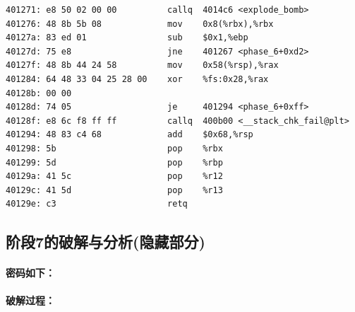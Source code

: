 \begin{lstlisting}
401271:	e8 50 02 00 00       	callq  4014c6 <explode_bomb>
401276:	48 8b 5b 08          	mov    0x8(%rbx),%rbx
40127a:	83 ed 01             	sub    $0x1,%ebp
40127d:	75 e8                	jne    401267 <phase_6+0xd2>
40127f:	48 8b 44 24 58       	mov    0x58(%rsp),%rax
401284:	64 48 33 04 25 28 00 	xor    %fs:0x28,%rax
40128b:	00 00 
40128d:	74 05                	je     401294 <phase_6+0xff>
40128f:	e8 6c f8 ff ff       	callq  400b00 <__stack_chk_fail@plt>
401294:	48 83 c4 68          	add    $0x68,%rsp
401298:	5b                   	pop    %rbx
401299:	5d                   	pop    %rbp
40129a:	41 5c                	pop    %r12
40129c:	41 5d                	pop    %r13
40129e:	c3                   	retq   
\end{lstlisting}

\subsection{阶段7的破解与分析(隐藏部分)}

\paragraph{密码如下：}

\paragraph{破解过程：}
